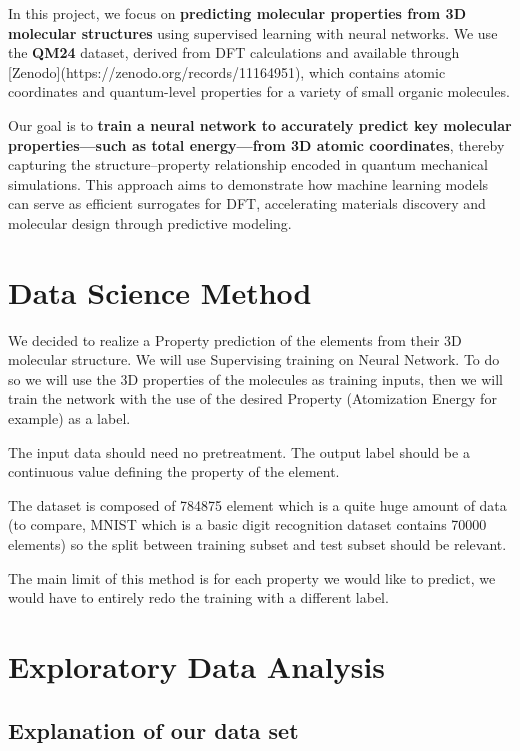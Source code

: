 \documentclass{article}
\begin{document}
In this project, we focus on \textbf{predicting molecular properties from 3D molecular structures} using supervised learning with neural networks. We use the \textbf{QM24} dataset, derived from DFT calculations and available through [Zenodo](https://zenodo.org/records/11164951), which contains atomic coordinates and quantum-level properties for a variety of small organic molecules.



Our goal is to \textbf{train a neural network to accurately predict key molecular properties—such as total energy—from 3D atomic coordinates}, thereby capturing the structure–property relationship encoded in quantum mechanical simulations. This approach aims to demonstrate how machine learning models can serve as efficient surrogates for DFT, accelerating materials discovery and molecular design through predictive modeling.


\section{Data Science Method}

We decided to realize a Property prediction of the elements from their 3D molecular structure. We will use Supervising training on Neural Network. To do so we will use the 3D properties of the molecules as training inputs, then we will train the network with the use of the desired Property (Atomization Energy for example) as a label.

The input data should need no pretreatment. The output label should be a continuous value defining the property of the element.

The dataset is composed of 784875 element which is a quite huge amount of data (to compare, MNIST which is a basic digit recognition dataset contains 70000 elements) so the split between training subset and test subset should be relevant.

The main limit of this method is for each property we would like to predict, we would have to entirely redo the training with a different label.  

\section{Exploratory Data Analysis}
    \subsection{Explanation of our data set}
\end{document}
